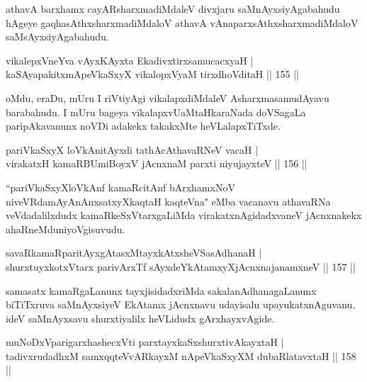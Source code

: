 \begin{artha}
athavA barxhamx cayARsharxmadiMdaleV divxjaru saMnAyxsiyAgabahudu hAgeye gaqhasAthxsharxmadiMdaloV athavA vAnaparxsAthxsharxma\-diMdaloV saMsAyxsiyAgabahudu.
\end{artha}

\begin{shl}
vikalepxVneYva vAyxKAyxta EkadivxtirxsamucacxyaH |\\
kaSAyapakitxmApeVkaSxyX vikalopxV\s yaM tirxdhoVditaH \hfill || 155 ||
\end{shl}

\begin{artha}
oMdu, eraDu, mUru I riVtiyAgi vikalapxdiMdaleV AsharxmasamudAyavu barabahudu. I mUru bageya vikalapxvU\break aMtaHkaraNada doVSagaLa paripAkavanunx noVDi adakekx takakxMte heVLalapxTiTxde.
\end{artha}

\begin{shl}
pariVkaSxyX loVkAnitAyxdi tathAcA\s \s thavaRNeV vacaH |\\
virakatxH kamaRBUmiBoyxV jAcnxnaM parxti niyujayxteV \hfill || 156 ||
\end{shl}

\begin{artha}
``pariVkaSxyXloVkAnf kamaRcitAnf bArxhamxNoV niveVRda\break mAyAnAnxsatxyXkaqtaH kaqteVna" eMba vacanavu athavaRNa veVdadalilxdudx kamaRkeSxVtarxgaLiMda virakatxnAgidadxvaneV jAcnxnakekx ahaRneMdu\break niyoVgisuvudu.
\end{artha}


\begin{shl}
savaRkamaRparitAyxgAtasxMtayxkAtxsheVSasAdhanaH |\\
shurxtuyxkotxV\s tarx parivArxTf sAyxdeYkAtamxyXjAcnxnajanamxneV \hfill || 157 ||
\end{shl}

\begin{artha}
samasatx kamaRgaLanunx tayxjisidadxriMda sakalanAdhanagaLanunx biTiTxruva saMnAyxsiyeV EkAtamx jAcnxnavu udayisalu upayukatxnAguvanu. ideV saMnAyxsavu shurxtiyalilx heVLidudx gArxhayxvAgide.
\end{artha}


\begin{shl}
muNoDxV\s parigarxhashecxVti parxtayxkaSxshurxtivAkayxtaH |\\
tadivxrudadhxM samxqqteVvARkayxM nApeVkaSxyXM dubaRlatavxtaH \hfill || 158 ||
\end{shl}

